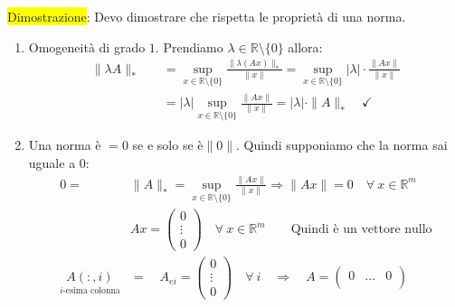 \documentclass{article}
\begin{document}
\colorbox{yellow}{Dimostrazione}: Devo dimostrare che rispetta le proprietà di una norma.
\begin{enumerate}
    \item Omogeneità di grado $1$. Prendiamo $\lambda\in\mathbb R\setminus\{0\}$ allora:
          \begin{align*}
              \|\lambda A\|_*\quad & =\sup_{x\in\mathbb R\setminus\{0\}}\frac{\|\lambda (Ax)\|_*}{\|x\|}=\sup_{x\in\mathbb R\setminus\{0\}}|\lambda|\cdot\frac{\|Ax\|}{\|x\|} \\
                                   & =|\lambda|\sup_{x\in\mathbb R\setminus\{0\}}\frac{\|Ax\|}{\|x\|}=|\lambda|\cdot\|A\|_*\quad \checkmark
          \end{align*}

    \item Una norma è $=0$ se e solo se è$\|0\|$. Quindi supponiamo che la norma sai uguale a $0$:
          \begin{align*}
              0=                                        & \|A\|_*=\sup_{x\in\mathbb R\setminus\{0\}}\frac{\|Ax\|}{\|x\|}\Rightarrow\|Ax\|=0\quad\forall\ x\in\mathbb R^m \\
                                                        & Ax=\begin{pmatrix}
                                                                 0      \\
                                                                 \vdots \\
                                                                 0
                                                             \end{pmatrix}\quad \forall\ x\in\mathbb R^m\qquad\text{Quindi è un vettore nullo}                           \\
              \underset{i\text{-esima colonna}}{A(:,i)} & =\quad A_{ei}=\begin{pmatrix}
                                                                            0      \\
                                                                            \vdots \\
                                                                            0
                                                                        \end{pmatrix}\quad\forall\ i\quad\Rightarrow\quad A=\begin{pmatrix}
                                                                                                                                0      & \dots & 0      \\

\end{pmatrix}
\end{align*}
\end{enumerate}
\end{document}
